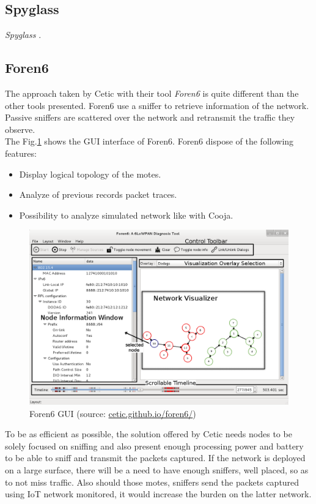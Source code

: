 \subsection{Spyglass}
\textit{Spyglass} \cite{buschmann2005spyglass}.

\subsection{Foren6}

The approach taken by Cetic with their tool \textit{Foren6} \cite{website:foren6} is quite different than the other tools presented. Foren6 use a sniffer to retrieve information of the network. Passive sniffers are scattered over the network and retransmit the traffic they observe. \\

The Fig.\ref{fig:foren6} shows the GUI interface of Foren6. Foren6 dispose of the following features:
\begin{itemize}
  \item Display logical topology of the motes.
  \item Analyze of previous records packet traces.
  \item Possibility to analyze simulated network like with Cooja. \\
\end{itemize}

\begin{figure}
  \centering
  \includegraphics[width=\textwidth]{res/foren6.png}
  \caption{Foren6 GUI (source: \url{cetic.github.io/foren6/})}
  \label{fig:foren6}
\end{figure}

To be as efficient as possible, the solution offered by Cetic needs nodes to be solely focused on sniffing and also present enough processing power and battery to be able to sniff and transmit the packets captured. If the network is deployed on a large surface, there will be a need to have enough sniffers, well placed, so as to not miss traffic. Also should those motes, sniffers send the packets captured using IoT network monitored, it would increase the burden on the latter network.
